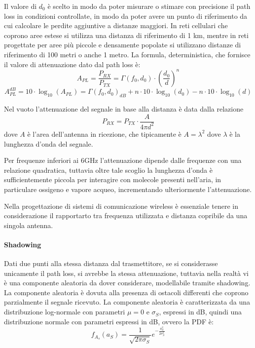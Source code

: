 Il valore di \( d_0 \) è scelto in modo da poter misurare o stimare con precisione il path loss in condizioni controllate, in modo da poter avere un punto di riferimento da cui calcolare le perdite aggiuntive a distanze maggiori.
In reti cellulari che coprono aree estese si utilizza una distanza di riferimento di 1 km, mentre in reti progettate per aree più piccole e densamente popolate si utilizzano distanze di riferimento di 100 metri o anche 1 metro.
La formula, deterministica, che fornisce il valore di attenuazione dato dal path loss è:
\[
    A_{PL} = \frac{P_{RX}}{P_{TX}} = \Gamma(f_0, d_0) \cdot \left( \frac{d_0}{d} \right)^n
\] 
\[
    A_{PL}^{dB} = 10 \cdot \log_{10}(A_{PL}) = \Gamma(f_0, d_0)_{dB} + n \cdot 10 \cdot \log_{10}(d_0) - n \cdot 10 \cdot \log_{10}(d)
\]


Nel vuoto l'attenuazione del segnale in base alla distanza è data dalla relazione
\[
    P_{RX} = P_{TX} \cdot \frac{A}{4\pi d^2}  
\]
dove \( A \) è l'area dell'antenna in ricezione, che tipicamente è \( A = \lambda^2 \) dove \( \lambda \) è la lunghezza d'onda del segnale.


Per frequenze inferiori ai 6GHz l'attenuazione dipende dalle frequenze con una relazione quadratica, tuttavia oltre tale scoglio la lunghezza d'onda è sufficientemente piccola per interagire con molecole presenti nell'aria, in particulare ossigeno e vapore acqueo, incrementando ulteriormente l'attenuazione.

Nella progettazione di sistemi di comunicazione wireless è essenziale tenere in considerazione il rapportarto tra frequenza utilizzata e distanza copribile da una singola antenna.

\paragraph*{Shadowing}

Dati due punti alla stessa distanza dal trasmettitore, se si considerasse unicamente il path loss, si avrebbe la stessa attenuazione, tuttavia nella realtà vi è una componente aleatoria da dover considerare, modellabile tramite shadowing. La componente aleatoria è dovuta alla presenza di ostacoli differenti che coprono parzialmente il segnale ricevuto. La componente aleatoria è caratterizzata da una distribuzione log-normale con parametri $\mu = 0$ e $\sigma_S$, espressi in dB, quindi una distribuzione normale con parametri espressi in dB, ovvero la PDF è:
\[
    f_{A_s}(a_S) = \frac{1}{\sqrt{2\pi \sigma_S}} e^{-\frac{a_S^2}{2\sigma_S^2}}
\]




